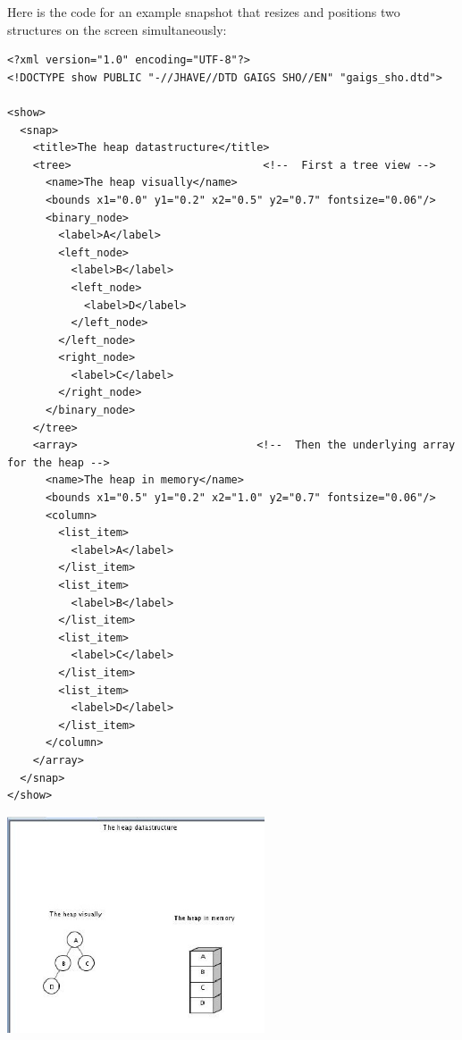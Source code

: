 \documentclass[12pt]{article}
\begin{document}
Here is the code for an example snapshot that resizes and positions
two structures on the screen simultaneously:

\footnotesize \begin{verbatim}
<?xml version="1.0" encoding="UTF-8"?>
<!DOCTYPE show PUBLIC "-//JHAVE//DTD GAIGS SHO//EN" "gaigs_sho.dtd">

<show>
  <snap>
    <title>The heap datastructure</title>
    <tree>                              <!--  First a tree view -->
      <name>The heap visually</name>
      <bounds x1="0.0" y1="0.2" x2="0.5" y2="0.7" fontsize="0.06"/>
      <binary_node>
        <label>A</label>
        <left_node>
          <label>B</label>
          <left_node>
            <label>D</label>
          </left_node>
        </left_node>
        <right_node>
          <label>C</label>
        </right_node>
      </binary_node>
    </tree>
    <array>                            <!--  Then the underlying array for the heap -->
      <name>The heap in memory</name>
      <bounds x1="0.5" y1="0.2" x2="1.0" y2="0.7" fontsize="0.06"/>
      <column>
        <list_item>
          <label>A</label>
        </list_item>
        <list_item>
          <label>B</label>
        </list_item>
        <list_item>
          <label>C</label>
        </list_item>
        <list_item>
          <label>D</label>
        </list_item>
      </column>
    </array>
  </snap>
</show>
\end{verbatim} \normalsize


\begin{center}
  \includegraphics[width=3in]{howto_graphics/bounds.eps}
\end{center}


\end{document}
